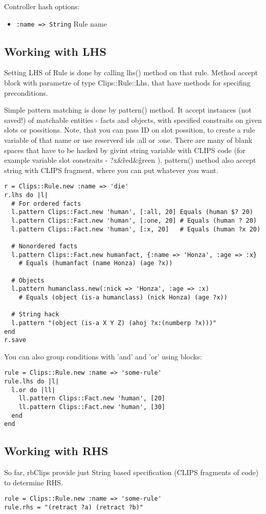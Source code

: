 \documentclass[a4paper,10pt]{article}
\begin{document}
Controller hash options:
\begin{itemize}
 \item \texttt{:name => String} Rule name
\end{itemize}


\subsection{Working with LHS}
Setting LHS of Rule is done by calling lhs() method on that rule. Method accept block with parametre of type Clips::Rule::Lhs, that have methods for specifing preconditions.

Simple pattern matching is done by pattern() method. It accept instances (not saved!) of matchable entities - facts and objects, with specified constraits on given slots or possitions. Note, that you can pass ID on slot possition, to create a rule variable of that name or use reserverd ids :all or :one. There are many of blank spaces that have to be hacked by givint string variable with CLIPS code (for example variable slot constraits - ?x\&\~red\&\~green ). pattern() method also accept string with CLIPS fragment, where you can put whatever you want.

\begin{verbatim}
r = Clips::Rule.new :name => 'die'
r.lhs do |l|
  # For ordered facts
  l.pattern Clips::Fact.new 'human', [:all, 20] Equals (human $? 20)
  l.pattern Clips::Fact.new 'human', [:one, 20] # Equals (human ? 20)
  l.pattern Clips::Fact.new 'human', [:x, 20]   # Equals (human ?x 20)
  
  # Nonordered facts
  l.pattern Clips::Fact.new humanfact, {:name => 'Honza', :age => :x} 
    # Equals (humanfact (name Honza) (age ?x))

  # Objects
  l.pattern humanclass.new(:nick => 'Honza', :age => :x)
    # Equals (object (is-a humanclass) (nick Honza) (age ?x))
	
  # String hack
  l.pattern "(object (is-a X Y Z) (ahoj ?x:(numberp ?x)))"
end
r.save
\end{verbatim}

You can also group conditions with 'and' and 'or' using blocks:
\begin{verbatim}
rule = Clips::Rule.new :name => 'some-rule'
rule.lhs do |l|
  l.or do |ll|
    ll.pattern Clips::Fact.new 'human', [20]
    ll.pattern Clips::Fact.new 'human', [30]
  end
end
\end{verbatim}

\subsection{Working with RHS}
So far, rbClips provide just String based specification (CLIPS fragments of code) to determine RHS.
\begin{verbatim}
rule = Clips::Rule.new :name => 'some-rule'
rule.rhs = "(retract ?a) (retract ?b)"
\end{verbatim}
\end{document}
